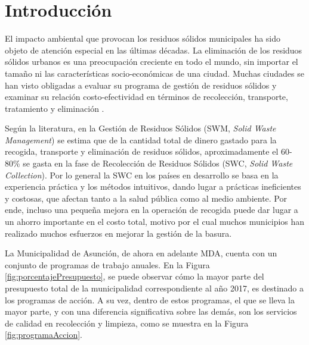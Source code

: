\chapter{Introducción}
\label{chap1}
\ifpdf
  \graphicspath{{Chapter1/Chapter1Figs/PNG/}{Chapter1/Chapter1Figs/PDF/}{Chapter1/Chapter1Figs/}}
\else
  \graphicspath{{Chapter1/Chapter1Figs/EPS/}{Chapter1/Chapter1Figs/}}
\fi


El impacto ambiental que provocan los residuos sólidos municipales ha sido objeto de atención especial en las últimas décadas. La eliminación de los residuos sólidos urbanos es una preocupación creciente en todo el mundo, sin importar el tamaño ni las características socio-económicas de una ciudad. Muchas ciudades se han visto obligadas a evaluar su programa de gestión de residuos sólidos y examinar su relación costo-efectividad en términos de recolección, transporte, tratamiento y eliminación \citep{Karadimas2007OptimalAlgorithm}.

Según la literatura, en la Gestión de Residuos Sólidos (SWM, \textit{Solid Waste Management}) se estima que de la cantidad total de dinero gastado para la recogida, transporte y eliminación de residuos sólidos, aproximadamente el 60-80\% se gasta en la fase de Recolección de Residuos Sólidos (SWC, \textit{Solid Waste Collection}). Por lo general la SWC en los países en desarrollo se basa en la experiencia práctica y los métodos intuitivos, dando lugar a prácticas ineficientes y costosas, que afectan tanto a la salud pública como al medio ambiente. Por ende, incluso una pequeña mejora en la operación de recogida puede dar lugar a un ahorro importante en el costo total, motivo por el cual muchos municipios han realizado muchos esfuerzos en mejorar la gestión de la basura.

La Municipalidad de Asunción, de ahora en adelante MDA, cuenta con un conjunto de programas de trabajo anuales. En la Figura \ref{fig:porcentajePresupuesto}, se puede observar cómo la mayor parte del presupuesto total de la municipalidad correspondiente al año 2017, es destinado a los programas de acción. A su vez, dentro de estos programas, el que se lleva la mayor parte, y con una diferencia significativa sobre las demás, son los servicios de calidad en recolección y limpieza, como se muestra en la Figura \ref{fig:programaAccion}.


